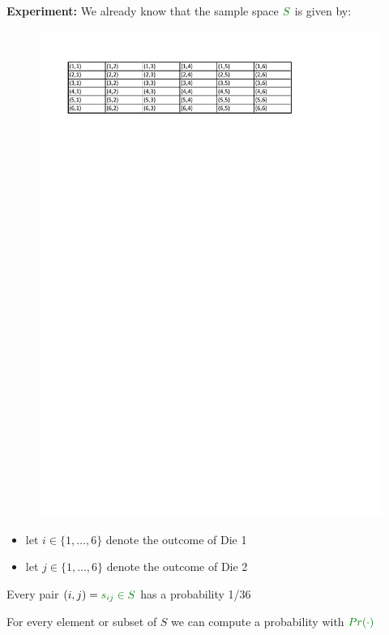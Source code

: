 \documentclass[smaller, handout]{beamer}\usepackage[]{graphicx}\usepackage[]{color}
\begin{document}
\begin{frame}{\secname}

  \begin{example}
  \textbf{Experiment:} We already know that the sample space $\color{Mygreen}S\color{black}$ is given by:

  \begin{figure}[h]
  \centering
  \includegraphics[scale=0.5]{img/C.pdf}
  \end{figure}

  \begin{itemize}
  \item let $i \in \{1, \dots, 6\}$ denote the outcome of Die 1
  \item let $j \in \{1, \dots, 6\}$ denote the outcome of Die 2
  \end{itemize}

  \begin{center}
  Every pair $(i,j) = \color{Mygreen}{s_{ij}} \in \color{Mygreen}{S}$ has a probability 1/36

   \medskip

  For every element or subset of $S$ we can compute a probability with $\color{Mygreen}{Pr(\cdot)}$
  \vspace{1cm}
  \end{center}
  \end{example}
\end{frame}
\end{document}
